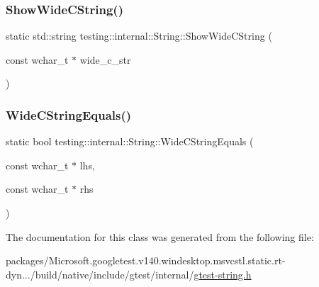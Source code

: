 \mbox{\label{classtesting_1_1internal_1_1_string_acbf0511e9ae5009f42de77e565f6ba61}} 
\subsubsection{\texorpdfstring{ShowWideCString()}{ShowWideCString()}}
{\footnotesize\ttfamily static std\+::string testing\+::internal\+::\+String\+::\+Show\+Wide\+C\+String (\begin{DoxyParamCaption}\item[{const wchar\+\_\+t $\ast$}]{wide\+\_\+c\+\_\+str }\end{DoxyParamCaption})\hspace{0.3cm}{\ttfamily [static]}}

\mbox{\label{classtesting_1_1internal_1_1_string_a4f5e053907ebced07fe0dc52dd2d1e85}} 
\subsubsection{\texorpdfstring{WideCStringEquals()}{WideCStringEquals()}}
{\footnotesize\ttfamily static bool testing\+::internal\+::\+String\+::\+Wide\+C\+String\+Equals (\begin{DoxyParamCaption}\item[{const wchar\+\_\+t $\ast$}]{lhs,  }\item[{const wchar\+\_\+t $\ast$}]{rhs }\end{DoxyParamCaption})\hspace{0.3cm}{\ttfamily [static]}}



The documentation for this class was generated from the following file\+:\begin{DoxyCompactItemize}
\item 
packages/\+Microsoft.\+googletest.\+v140.\+windesktop.\+msvcstl.\+static.\+rt-\/dyn.../build/native/include/gtest/internal/\mbox{\hyperlink{gtest-string_8h}{gtest-\/string.\+h}}\end{DoxyCompactItemize}
